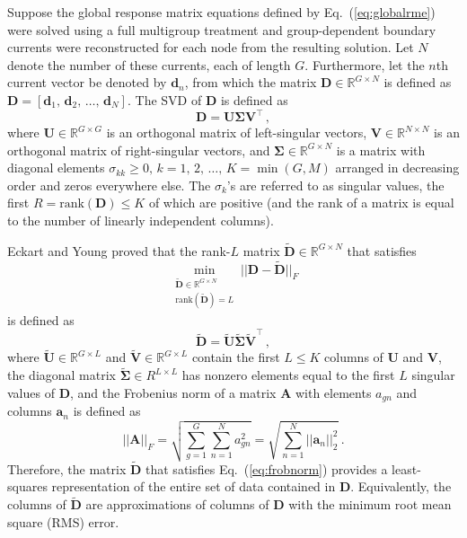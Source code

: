 \documentclass[5p,times,twocolumn,10pt]{elsarticle}
\newcommand{\EQ}[1]{Eq.~(\ref{#1})}               %
\begin{document}
    Suppose the global response matrix equations defined 
    by \EQ{eq:globalrme} were solved using a full multigroup 
    treatment and group-dependent boundary currents were 
    reconstructed for each node from the resulting solution.
    Let $N$ denote the number of these currents, each of length 
    $G$.  Furthermore, let the $n$th
    current vector be denoted by $\mathbf{d}_n$, from which 
    the matrix $\mathbf{D} \in \mathbb{R}^{G\times N}$ is defined 
    as $\mathbf{D} = [\mathbf{d}_1,\, \mathbf{d}_2,\, \ldots, \, \mathbf{d}_N]$.
    The SVD of $\mathbf{D}$ is defined as
    \begin{equation}
        \mathbf{D} = \mathbf{U} \bm{\Sigma} \mathbf{V}^{\intercal} \, ,
        \label{eq:svd}
    \end{equation}
    where $\mathbf{U} \in \mathbb{R}^{G\times G}$ is an orthogonal matrix of 
    left-singular vectors,
    $\mathbf{V} \in \mathbb{R}^{N\times N}$ is an orthogonal matrix of 
    right-singular vectors, 
    and  $\bm{\Sigma} \in \mathbb{R}^{G\times N}$ is a matrix with  
    diagonal elements $\sigma_{kk} \geq 0, \,  k = 1,\,2,\, \ldots,\, K = 
    \min(G, M)$
    arranged in decreasing order
    and zeros everywhere else.  
    The $\sigma_k$'s are referred to as singular values, 
    the first $R=\text{rank}(\mathbf{D})\leq K$ of which  
    are positive (and the rank of a matrix is equal to the 
    number of linearly independent columns).  
    
    Eckart and Young\cite{eckart1936approximation} proved that the rank-$L$ 
    matrix $\tilde{\mathbf{D}} \in \mathbb{R}^{G\times N}$
    that satisfies
    \begin{equation}
        \min_{ \substack{\tilde{\mathbf{D}} \in \mathbb{R}^{G\times N} \\ 
                \text{rank}(\tilde{\mathbf{D}})=L }} 
        || \mathbf{D} - \tilde{\mathbf{D}} ||_F 
        \label{eq:frobnorm}
    \end{equation}
    is defined as
    \begin{equation}
        \tilde{\mathbf{D}} = \tilde{\mathbf{U}} \tilde{\bm{\Sigma}} 
        \tilde{\mathbf{V}}^{\intercal} \, ,
        \label{eq:svdL}
    \end{equation}
    where $\tilde{\mathbf{U}} \in \mathbb{R}^{G\times L}$ 
    and   $\tilde{\mathbf{V}} \in \mathbb{R}^{G\times L}$ 
    contain the first $L \leq K$ columns of $\mathbf{U}$ and $\mathbf{V}$,
    the diagonal matrix $\tilde{\bm{\Sigma}} \in R^{L\times L}$ 
    has nonzero elements equal to 
    the first $L$ singular values of $\mathbf{D}$, and the
    Frobenius norm of a matrix $\mathbf{A}$ with 
    elements $a_{gn}$ and columns $\mathbf{a}_n$ is defined as
    \begin{equation}
        ||\mathbf{A}||_F = \sqrt{\sum^G_{g=1} \sum^N_{n=1} a_{gn}^2} = 
        \sqrt{\sum_{n=1}^N ||\mathbf{a}_n||^2_2 }\, .
    \end{equation}
    Therefore, the matrix $\tilde{\mathbf{D}}$ that satisfies \EQ{eq:frobnorm} 
    provides a least-squares representation of the entire set of data contained 
    in $\mathbf{D}$.  Equivalently, the columns of $\tilde{\mathbf{D}}$ are 
    approximations of columns of $\mathbf{D}$ with the minimum root mean square 
    (RMS) error. 
    
\end{document}
